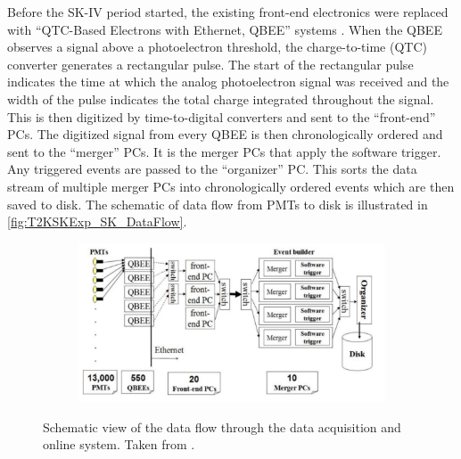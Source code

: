 Before the SK-IV period started, the existing front-end electronics were replaced with ``QTC-Based Electrons with Ethernet, QBEE'' systems \cite{Nishino2009-wh}. When the QBEE observes a signal above a  photoelectron threshold, the charge-to-time (QTC) converter generates a rectangular pulse. The start of the rectangular pulse indicates the time at which the analog photoelectron signal was received and the width of the pulse indicates the total charge integrated throughout the signal. This is then digitized by time-to-digital converters and sent to the ``front-end'' PCs. The digitized signal from every QBEE is then chronologically ordered and sent to the ``merger'' PCs. It is the merger PCs that apply the software trigger. Any triggered events are passed to the ``organizer'' PC. This sorts the data stream of multiple merger PCs into chronologically ordered events which are then saved to disk. The schematic of data flow from PMTs to disk is illustrated in \autoref{fig:T2KSKExp_SK_DataFlow}.

\begin{figure}[h]
  \begin{subfigure}[t]{0.80\textwidth}
    \includegraphics[width=\textwidth, trim={0mm 0mm 0mm 0mm}, clip,page=1]{Figures/Detectors/SKDataFlow.pdf}
  \end{subfigure}
  \caption{Schematic view of the data flow through the data acquisition and online system. Taken from \cite{5446533}.}
  \label{fig:T2KSKExp_SK_DataFlow}
\end{figure}

